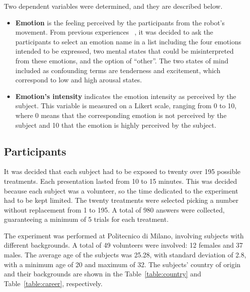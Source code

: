 Two dependent variables were determined, and they are described below.

\begin{itemize}
	\item \textbf{Emotion} is the feeling perceived by the participants from the robot's movement. From previous experiences~\cite{angel2014}
	, it was decided to ask the participants to select an emotion name in a list including the four emotions intended to be expressed, two mental states that could be misinterpreted from these emotions, and the option of ``other''. 
	The two  states of mind included as confounding terms are tenderness and excitement, which correspond to low and high arousal states.
	
	\item \textbf{Emotion's intensity} indicates the emotion intensity as perceived by the subject. This variable is measured on a Likert scale, ranging from 0 to 10, where 0 means that the corresponding emotion is not perceived by the subject and 10 that the emotion is highly perceived by the subject. 

\end{itemize}

\subsection{Participants}

It was decided that each subject had to be exposed to twenty over 195 possible treatments. Each presentation lasted  from 10 to 15 minutes. This was decided because each subject was a volunteer, so the time dedicated to the experiment had to be kept limited. The twenty treatments were selected picking a number without replacement from 1 to 195. A total of 980 answers were collected, guaranteeing a minimum of 5 trials for each treatment. 

The experiment was performed at Politecnico di Milano, involving subjects with different backgrounds.
A total of 49 volunteers were involved: 12 females and 37 males. The average age of the subjects was 25.28, with standard deviation of 2.8, with a minimum age of 20 and maximum of 32. The subjects' country of origin and their backgrounds are shown in the Table~\ref{table:country} and Table~\ref{table:career}, respectively. 

